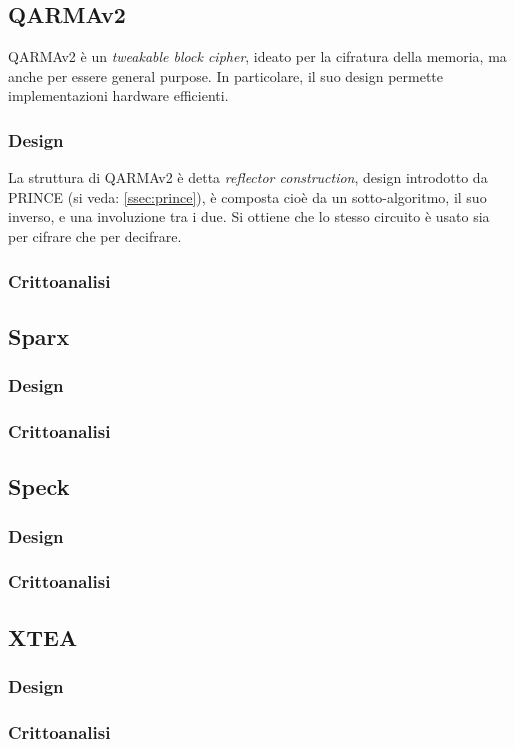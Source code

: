 \documentclass[target=bach,aauheader=,style=]{thud}
\begin{document}
		\subsection{QARMAv2}\cite{qarmav2}
		QARMAv2 è un \textit{tweakable block cipher}, ideato per la cifratura della memoria, ma anche per essere general purpose. In particolare, il suo design permette implementazioni hardware efficienti.
			\subsubsection{Design}
			La struttura di QARMAv2 è detta \textit{reflector construction}, design introdotto da PRINCE (si veda: \ref{ssec:prince}), è composta cioè da un sotto-algoritmo, il suo inverso, e una involuzione tra i due. Si ottiene che lo stesso circuito è usato sia per cifrare che per decifrare.
			\subsubsection{Crittoanalisi}
		\subsection{Sparx\cite{sparx}}
			\subsubsection{Design}
			\subsubsection{Crittoanalisi}
		\subsection{Speck\cite{speck}}
			\subsubsection{Design}
			\subsubsection{Crittoanalisi}
		\subsection{XTEA}
			\subsubsection{Design}
			\subsubsection{Crittoanalisi}
\end{document}
